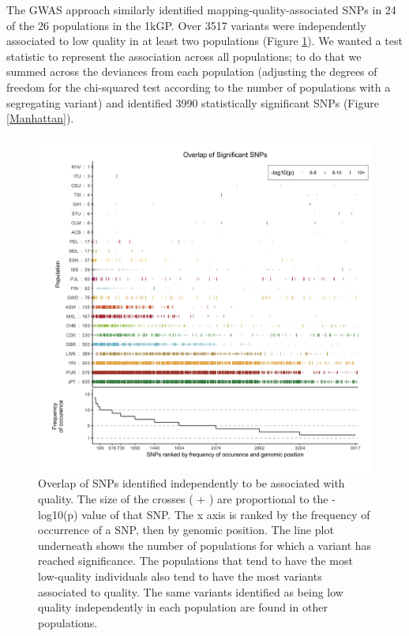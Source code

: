 \documentclass[9pt,lineno]{elife}
\begin{document}
The GWAS approach similarly identified mapping-quality-associated SNPs in 24 of the 26 populations in the 1kGP.
Over 3517 variants were independently associated to low quality in at least two populations  (Figure \ref{OverLap}). We wanted a test statistic to represent the association across all populations; to do that we summed across the deviances from each population (adjusting the degrees of freedom for the chi-squared test according to the number of populations with a segregating variant) and identified 3990 statistically significant SNPs (Figure \ref{Manhattan}).

\begin{figure}
\includegraphics[width=\hsize,keepaspectratio]{./Figures/SNPOverlap6.jpg}

\caption{Overlap of SNPs identified independently to be associated with quality. 
The size of the crosses ( + ) are proportional to the -log10(p) value of that SNP.
The x axis is ranked by the frequency of occurrence of a SNP, then by genomic position.
The line plot underneath shows the number of populations for which a variant has reached significance.
The populations that tend to have the most low-quality individuals also tend to have the most variants associated to quality. 
The same variants identified as being low quality independently in each population are found in other populations. }
  \label{OverLap}
\end{figure}
\end{document}
